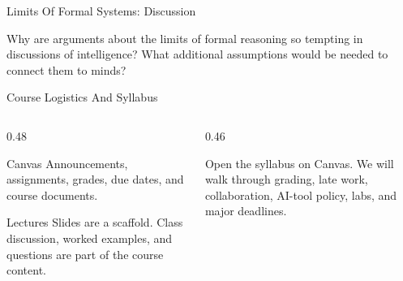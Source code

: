 \documentclass[aspectratio=169]{beamer}
\begin{document}
\begin{frame}{Limits Of Formal Systems: Discussion}
  \begin{activity}
    Why are arguments about the limits of formal reasoning so tempting in discussions of intelligence? What additional assumptions would be needed to connect them to minds?
  \end{activity}
\end{frame}


\begin{frame}{Course Logistics And Syllabus}
  \begin{columns}[T,onlytextwidth]
    \begin{column}{0.48\textwidth}
      \begin{block}{Canvas}
        Announcements, assignments, grades, due dates, and course documents.
      \end{block}
      \begin{block}{Lectures}
        Slides are a scaffold. Class discussion, worked examples, and questions are part of the course content.
      \end{block}
    \end{column}
    \begin{column}{0.46\textwidth}
      \begin{activity}
        Open the syllabus on Canvas. We will walk through grading, late work, collaboration, AI-tool policy, labs, and major deadlines.
      \end{activity}
    \end{column}
  \end{columns}
\end{frame}
\end{document}
